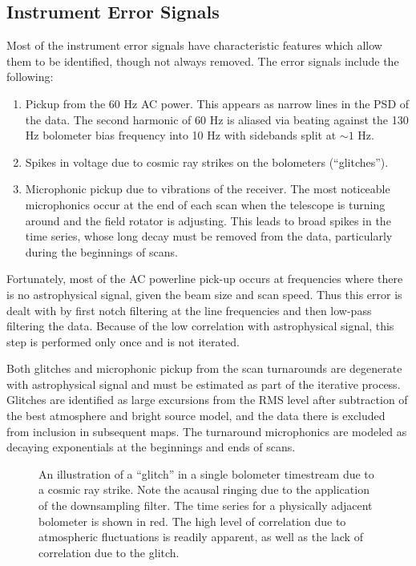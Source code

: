 \documentclass[12pt,preprint]{aastex}
\def\Figure#1#2#3#4{
\begin{figure}[htb]
\epsscale{#4}
\plotone{#1}
\caption{#2}
\label{#3}
\end{figure}
}
\begin{document}
\subsection{Instrument Error Signals}

Most of the instrument error signals have characteristic features
which allow them to be identified, though not always removed.  The
error signals include the following:
\begin{enumerate}

\item Pickup from the 60 Hz AC power.  This appears as narrow lines in
the PSD of the data.  The second harmonic of 60 Hz is aliased via
beating against the 130 Hz bolometer bias frequency into 10 Hz with
sidebands split at $\sim1$ Hz.

\item Spikes in voltage due to cosmic ray strikes on the bolometers
(``glitches'').

\item Microphonic pickup due to vibrations of the receiver.  The most
noticeable microphonics occur at the end of each scan when the
telescope is turning around and the field rotator is adjusting.  This
leads to broad spikes in the time series, whose long decay must be
removed from the data, particularly during the beginnings of scans.


\end{enumerate}

Fortunately, most of the AC powerline pick-up occurs at frequencies
where there is no astrophysical signal, given the beam size and scan
speed.  Thus this error is dealt with by first notch filtering at the
line frequencies and then low-pass filtering the data.  Because of the
low correlation with astrophysical signal, this step is performed only
once and is not iterated.

Both glitches and microphonic pickup from the scan turnarounds are
degenerate with astrophysical signal and must be estimated as part of
the iterative process.  Glitches are identified as large excursions
from the RMS level after subtraction of the best atmosphere and bright
source model, and the data there is excluded from inclusion in
subsequent maps.  The turnaround microphonics are modeled as decaying
exponentials at the beginnings and ends of scans.

\Figure{flagger_plots}{An illustration of a ``glitch'' in a single
bolometer timestream due to a cosmic ray strike.  Note the acausal
ringing due to the application of the downsampling filter.  The time
series for a physically adjacent bolometer is shown in red.  The high
level of correlation due to atmospheric fluctuations is readily
apparent, as well as the lack of correlation due to the
glitch.}{fig:CosmicRayGlitch}{1.0}
\end{document}
